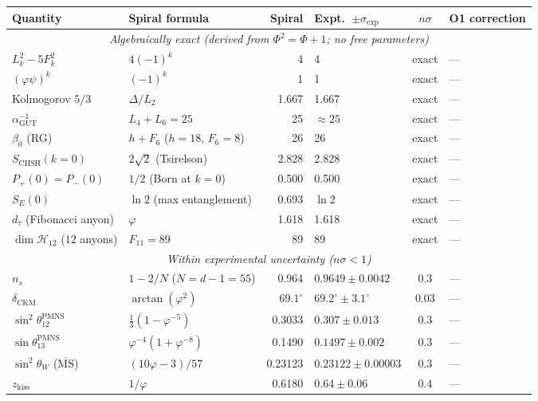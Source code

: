 \documentclass[12pt,a4paper]{article}
\begin{document}
\begin{center}
\scriptsize\setlength{\tabcolsep}{3pt}
\begin{tabular}{|l|p{2.1cm}|r|p{2.2cm}|c|p{1.85cm}|}
\hline
\textbf{Quantity} & \textbf{Spiral formula} & \textbf{Spiral} & \textbf{Expt.\ $\pm\sigma_{\mathrm{exp}}$} & $n\sigma$ & \textbf{O1 correction} \\
\hline
\multicolumn{6}{|c|}{\textit{Algebraically exact (derived from $\Phi^2{=}\Phi{+}1$; no free parameters)}} \\
\hline
$L_k^2 - 5F_k^2$ & $4(-1)^k$ & 4 & 4 & exact & --- \\
$(\varphi\psi)^k$ & $(-1)^k$ & 1 & 1 & exact & --- \\
Kolmogorov $5/3$ & $\Delta/L_2$ & 1.667 & 1.667 & exact & --- \\
$\alpha_{\mathrm{GUT}}^{-1}$ & $L_4 + L_6 = 25$ & 25 & $\approx 25$ & exact & --- \\
$\beta_0$ (RG) & $h + F_6$ ($h{=}18$, $F_6{=}8$) & 26 & 26 & exact & --- \\
$S_{\mathrm{CHSH}}(k{=}0)$ & $2\sqrt{2}$ (Tsirelson) & 2.828 & 2.828 & exact & --- \\
$P_+(0) = P_-(0)$ & $1/2$ (Born at $k{=}0$) & 0.500 & 0.500 & exact & --- \\
$S_E(0)$ & $\ln 2$ (max entanglement) & 0.693 & $\ln 2$ & exact & --- \\
$d_\tau$ (Fibonacci anyon) & $\varphi$ & 1.618 & 1.618 & exact & --- \\
$\dim\mathcal{H}_{12}$ ($12$ anyons) & $F_{11} = 89$ & 89 & 89 & exact & --- \\
\hline
\multicolumn{6}{|c|}{\textit{Within experimental uncertainty ($n\sigma < 1$)}} \\
\hline
$n_s$ & $1 - 2/N$ ($N{=}d{-}1{=}55$) & 0.964 & $0.9649 \pm 0.0042$ & $0.3$ & --- \\
$\delta_{\mathrm{CKM}}$ & $\arctan(\varphi^2)$ & $69.1^\circ$ & $69.2^\circ \pm 3.1^\circ$ & $0.03$ & --- \\
$\sin^2\theta_{12}^{\mathrm{PMNS}}$ & $\frac{1}{3}(1 - \varphi^{-5})$ & 0.3033 & $0.307 \pm 0.013$ & $0.3$ & --- \\
$\sin\theta_{13}^{\mathrm{PMNS}}$ & $\varphi^{-4}(1 + \varphi^{-8})$ & 0.1490 & $0.1497 \pm 0.002$ & $0.3$ & --- \\
$\sin^2\theta_W$ ($\overline{\mathrm{MS}}$) & $(10\varphi{-}3)/57$ & 0.23123 & $0.23122 \pm 0.00003$ & $0.3$ & --- \\
$z_{\mathrm{kiss}}$ & $1/\varphi$ & 0.6180 & $0.64 \pm 0.06$ & $0.4$ & --- \\

\end{tabular}
\end{center}
\end{document}
